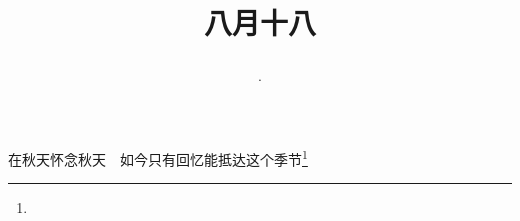 \title{\date[d=20,m=9,y=2024][year:cn-y,年,month:cn,day:cn,日,·,weekday]·八月十八 }
在秋天怀念秋天　如今只有回忆能抵达这个季节\footnote{ }

